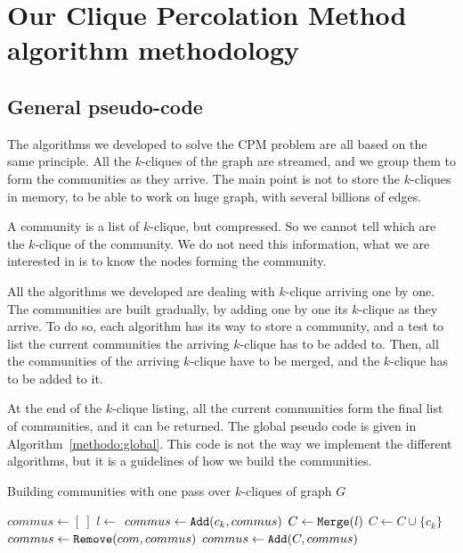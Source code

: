 \section{Our Clique Percolation Method algorithm methodology}

\subsection{General pseudo-code}

The algorithms we developed to solve the CPM problem are all based on the same principle. All the $k$-cliques of the graph are streamed, and we group them to form the communities as they arrive. The main point is not to store the $k$-cliques in memory, to be able to work on huge graph, with several billions of edges.

A community is a list of $k$-clique, but compressed. So we cannot tell which are the $k$-clique of the community. We do not need this information, what we are interested in is to know the nodes forming the community.

All the algorithms we developed are dealing with $k$-clique arriving one by one. The communities are built gradually, by adding one by one its $k$-clique as they arrive. To do so, each algorithm has its way to store a community, and a test to list the current communities the arriving $k$-clique has to be added to. Then, all the communities of the arriving $k$-clique have to be merged, and the $k$-clique has to be added to it.

At the end of the $k$-clique listing, all the current communities form the final list of communities, and it can be returned. The global pseudo code is given in Algorithm~\ref{methodo:global}. This code is not the way we implement the different algorithms, but it is a guidelines of how we build the communities.

\begin{algorithm}[!htbp]
  \caption{Building communities with one pass over $k$-cliques of graph $G$}
  \label{methodo:global}
  \begin{algorithmic}[1]
    \State $commus \gets [ \ ]$
    \State $l \gets$ 
     
    \State $commus \gets {\tt Add}(c_k,commus)$ 
    \Else {}
    \State $C \gets {\tt Merge}(l)$
    \State $C \gets C \cup \{c_k\}$
    \State $commus \gets {\tt Remove}(com,commus)$
    \EndFor
    \State $commus \gets {\tt Add}(C,commus)$
    \EndIf
    \EndFor
  \end{algorithmic}
\end{algorithm}

